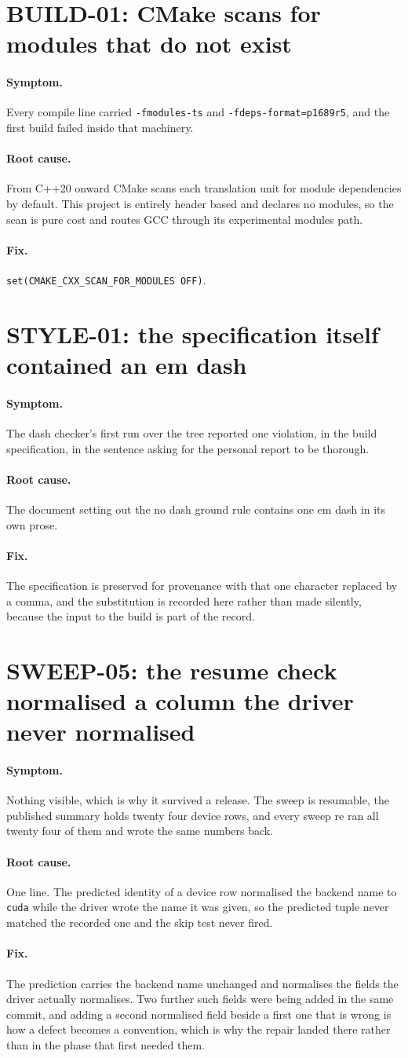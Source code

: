 \documentclass[11pt,a4paper]{report}
\newcommand{\symptom}[1]{\paragraph{Symptom.}#1}
\newcommand{\rootcause}[1]{\paragraph{Root cause.}#1}
\newcommand{\fix}[1]{\paragraph{Fix.}#1}
\begin{document}
\section{BUILD-01: CMake scans for modules that do not exist}

\symptom{Every compile line carried \texttt{-fmodules-ts} and
\texttt{-fdeps-format=p1689r5}, and the first build failed inside that
machinery.}

\rootcause{From C++20 onward CMake scans each translation unit for module
dependencies by default. This project is entirely header based and declares no
modules, so the scan is pure cost and routes GCC through its experimental
modules path.}

\fix{\texttt{set(CMAKE\_CXX\_SCAN\_FOR\_MODULES OFF)}.}

\section{STYLE-01: the specification itself contained an em dash}

\symptom{The dash checker's first run over the tree reported one violation, in
the build specification, in the sentence asking for the personal report to be
thorough.}

\rootcause{The document setting out the no dash ground rule contains one em dash
in its own prose.}

\fix{The specification is preserved for provenance with that one character
replaced by a comma, and the substitution is recorded here rather than made
silently, because the input to the build is part of the record.}

\section{SWEEP-05: the resume check normalised a column the driver never normalised}

\symptom{Nothing visible, which is why it survived a release. The sweep is
resumable, the published summary holds twenty four device rows, and every sweep
re ran all twenty four of them and wrote the same numbers back.}

\rootcause{One line. The predicted identity of a device row normalised the
backend name to \texttt{cuda} while the driver wrote the name it was given, so
the predicted tuple never matched the recorded one and the skip test never
fired.}

\fix{The prediction carries the backend name unchanged and normalises the fields
the driver actually normalises. Two further such fields were being added in the
same commit, and adding a second normalised field beside a first one that is
wrong is how a defect becomes a convention, which is why the repair landed there
rather than in the phase that first needed them.}
\end{document}
